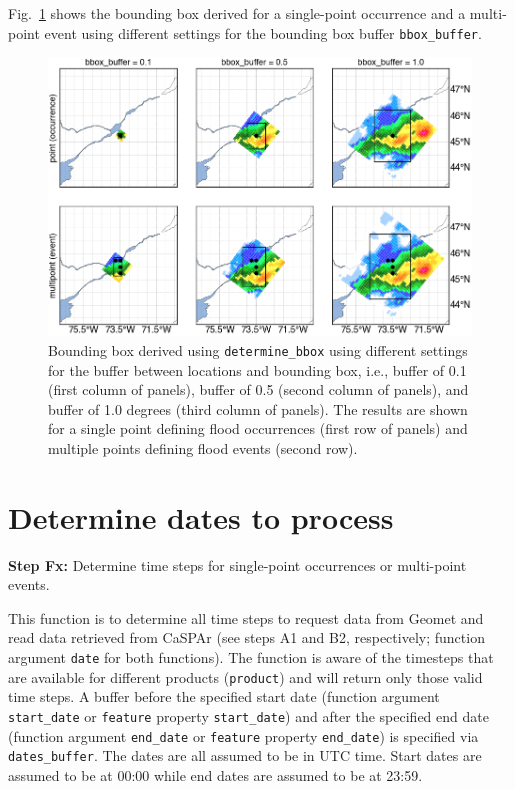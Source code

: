 \documentclass[10pt,a4paper,titlepage,parskip]{scrartcl}
\begin{document}
Fig.~\ref{fig:plot_example:bounding_box} shows the bounding box derived for a single-point occurrence and a multi-point event using different settings for the bounding box buffer \texttt{bbox\_buffer}.

\begin{figure}
	\centering
	\includegraphics[width=0.7\linewidth]{figures/test-bounding-box.png}
	\caption{Bounding box derived using \texttt{determine\_bbox} using different settings for the buffer between locations and bounding box, i.e., buffer of 0.1 (first column of panels), buffer of 0.5 (second column of panels), and buffer of 1.0 degrees (third column of panels). The results are shown for a single point defining flood occurrences (first row of panels) and multiple points defining flood events (second row).}
	\label{fig:plot_example:bounding_box}
\end{figure}
\clearpage

\section{Determine dates to process}

\textbf{Step Fx:} Determine time steps for single-point occurrences or multi-point events.

This function is to determine all time steps to request data from Geomet and read data retrieved from CaSPAr (see steps A1 and B2, respectively; function argument \texttt{date} for both functions). The function is aware of the timesteps that are available for different products (\texttt{product}) and will return only those valid time steps. A buffer before the specified start date (function argument \texttt{start\_date} or \texttt{feature} property \texttt{start\_date}) and after the specified end date (function argument \texttt{end\_date} or \texttt{feature} property \texttt{end\_date}) is specified via \texttt{dates\_buffer}. The dates are all assumed to be in UTC time. Start dates are assumed to be at 00:00 while end dates are assumed to be at 23:59.
\end{document}
